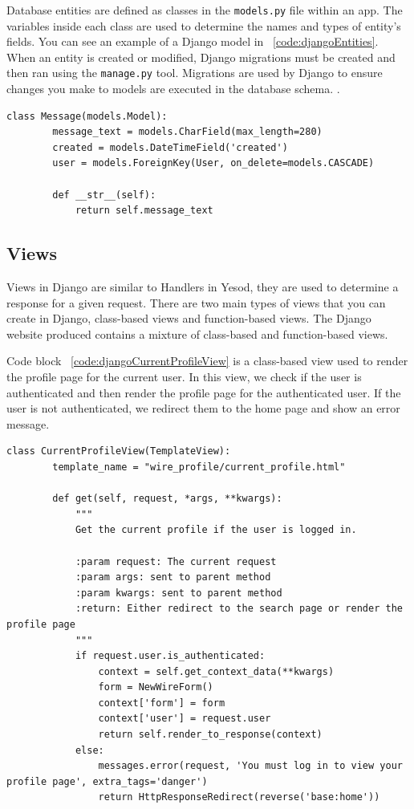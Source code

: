 Database entities are defined as classes in the \texttt{models.py} file within an app.
The variables inside
each class are used to determine the names and types of entity's fields. You can see
an example of a Django model in ~\ref{code:djangoEntities}. When an entity is created 
or modified, Django migrations must be created and then ran using the \texttt{manage.py} tool. 
Migrations are used by Django to ensure changes you make to models are executed in 
the database schema. \parencite{djangoMigrations}.

\begin{lstlisting}[caption={The user entity in Django},label={code:djangoEntities}]
	class Message(models.Model):
		message_text = models.CharField(max_length=280)
		created = models.DateTimeField('created')
		user = models.ForeignKey(User, on_delete=models.CASCADE)

		def __str__(self):
			return self.message_text
\end{lstlisting}

\subsection{Views}

Views in Django are similar to Handlers in Yesod, they are used to determine
a response for a given request. There are two main types of views that you can
create in Django, class-based views and function-based views. The Django website
produced contains a mixture of class-based and function-based views.

Code block ~\ref{code:djangoCurrentProfileView} is a class-based view used to
render the profile page for the current user. In this view, we check if the
user is authenticated and then render the profile page for the authenticated
user. If the user is not authenticated, we redirect them to the home page and
show an error message.

\begin{lstlisting}[caption={Class-based current profile view},label={code:djangoCurrentProfileView}]
	class CurrentProfileView(TemplateView):
		template_name = "wire_profile/current_profile.html"

		def get(self, request, *args, **kwargs):
			"""
			Get the current profile if the user is logged in.

			:param request: The current request
			:param args: sent to parent method
			:param kwargs: sent to parent method
			:return: Either redirect to the search page or render the profile page
			"""
			if request.user.is_authenticated:
				context = self.get_context_data(**kwargs)
				form = NewWireForm()
				context['form'] = form
				context['user'] = request.user
				return self.render_to_response(context)
			else:
				messages.error(request, 'You must log in to view your profile page', extra_tags='danger')
				return HttpResponseRedirect(reverse('base:home'))
\end{lstlisting}


